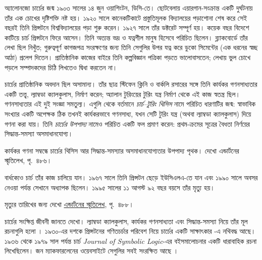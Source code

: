 \documentclass[../../../include/open-logic-section]{subfiles}
\begin{document}



অ্যালোনজো চার্চের জন্ম ১৯০৩ সালের ১৪ জুন ওয়াশিংটন,
ডিসি-তে। ছোটবেলায় এয়ারগান-সংক্রান্ত একটি দুর্ঘটনায়
তাঁর এক চোখের দৃষ্টিশক্তি নষ্ট হয়। ১৯২০ সালে কানেকটিকাটে
প্রস্তুতিমূলক বিদ্যালয়ের পড়াশোনা শেষ করে সেই বছরই তিনি
প্রিন্সটনে বিশ্ববিদ্যালয়ের পড়া শুরু করেন। ১৯২৭ সালে
তাঁর ডক্টরেট সম্পূর্ণ হয়। কয়েক বছর বিদেশে কাটিয়ে চার্চ
প্রিন্সটনে ফিরে আসেন। তিনি অত্যন্ত ভদ্র ও যত্নশীল মানুষ
হিসেবে পরিচিত ছিলেন। ব্ল্যাকবোর্ডে তাঁর লেখা ছিল
নিখুঁত; গুরুত্বপূর্ণ কাগজপত্র সংরক্ষণের জন্য তিনি
সেগুলির উপর যত্ন করে ডুকো সিমেন্টের (এক ধরনের স্বচ্ছ
আঠা) প্রলেপ দিতেন। প্রাতিষ্ঠানিক কাজের বাইরে তিনি
কল্পবিজ্ঞান পত্রিকা পড়তে ভালোবাসতেন; লেখায় ভুল
চোখে পড়লে সম্পাদকদের চিঠি লিখতেও দ্বিধা করতেন না।

চার্চের প্রাতিষ্ঠানিক অবদান ছিল অসামান্য। তাঁর ছাত্র
স্টিফেন ক্লিনি ও বার্কলি রসারের সঙ্গে তিনি কার্যকর
গণনসাধ্যতার একটি তত্ত্ব, ল্যাম্বডা ক্যালকুলাস, নির্মাণ
করেন; অ্যালান টুরিংয়ের টুরিং যন্ত্র নির্মাণ থেকে এই কাজ
স্বতন্ত্র ছিল। গণনসাধ্যতার এই দুই সংজ্ঞা সমতুল্য।
এগুলি থেকে বর্তমানে \emph{চার্চ--টুরিং থিসিস} নামে
পরিচিত ধারণাটির জন্ম: স্বাভাবিক সংখ্যার একটি অপেক্ষক
ঠিক তখনই কার্যকরভাবে গণনসাধ্য, যখন সেটি টুরিং যন্ত্র
(অথবা ল্যাম্বডা ক্যালকুলাস) দিয়ে গণনা করা যায়। তিনি
\emph{চার্চের উপপাদ্য} নামেও পরিচিত একটি ফল প্রমাণ
করেন: প্রথম-ক্রমের সূত্রের বৈধতা নির্ণয়ের সিদ্ধান্ত-সমস্যা
অসমাধানযোগ্য।

\par\smallskip\noindent কার্যকর গণনা সম্বন্ধে চার্চের থিসিস আর সিদ্ধান্ত-সমস্যার অসমাধানযোগ্যতার উপপাদ্য পৃথক। দেখো এন্ডার্টনের স্মৃতিলেখ, পৃ.~৪৮৬।

বার্ধক্যেও চার্চ তাঁর কাজ চালিয়ে যান। ১৯৬৭ সালে তিনি
প্রিন্সটন ছেড়ে ইউসিএলএ-তে যান এবং ১৯৯০ সালে অবসর
নেওয়া পর্যন্ত সেখানে অধ্যাপক ছিলেন। ১৯৯৫ সালের
১১ আগস্ট ৯২ বছর বয়সে তাঁর মৃত্যু হয়।

\par\smallskip\noindent মৃত্যুর তারিখের জন্য দেখো \href{https://doi.org/10.1017/S1079898600008040}{এন্ডার্টনের স্মৃতিলেখ}, পৃ.~৪৮৮।

\begin{reading}
চার্চের সংক্ষিপ্ত জীবনী জানতে \citet{EndertonND} দেখো।
ল্যাম্বডা ক্যালকুলাস, কার্যকর গণনসাধ্যতা এবং
সিদ্ধান্ত-সমস্যা নিয়ে তাঁর মূল রচনাগুলি হলো \citet{Church1936,Church1936a}।
১৯৩০-এর দশকে প্রিন্সটনের গণিতচর্চার পরিবেশ নিয়ে
চার্চের একটি সাক্ষাৎকার \citet{Aspray1984}-এ নথিবদ্ধ
আছে। ১৯৩৬ থেকে ১৯৭৯ সাল পর্যন্ত চার্চ \emph{Journal of
Symbolic Logic}-এর বইসমালোচনার একটি ধারাবাহিক রচনা
লিখেছিলেন। জন ম্যাকফারলেনের ওয়েবসাইটে সেগুলির
সবই সংরক্ষিত আছে \citep{MacFarlane2015}।
\end{reading}
\end{document}
